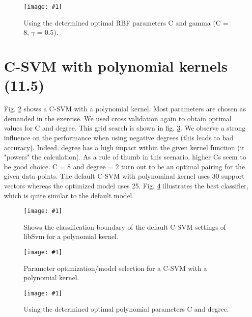 \documentclass[a4paper,headings=small]{scrartcl}
\newcommand{\image}[3]{
	\begin{figure}[htbp]
		\centering
		\texttt{[image: \#1]}
		\caption{#3}
		\label{fig:#1}
	\end{figure}
}
\begin{document}
\image{out_classifierSvm_cSvmRbfOptimalParams}{0.9}%
	{Using the determined optimal RBF parameters C and gamma (C = 8, $\gamma$ = 0.5).}


\section{C-SVM with polynomial kernels (11.5)}

Fig. \ref{fig:out_classifierSvm_cSvmPolyDefault} shows a C-SVM with a polynomial kernel. Most parameters are chosen as demanded in the exercise. We used cross validation again to obtain optimal values for C and degree. This grid search is shown in fig. \ref{fig:out_cSvmPolyParameterOptimization}. We observe a strong influence on the performance when using negative degrees (this leads to bad accuracy). Indeed, degree has a high impact within the given kernel function (it "powers" the calculation). As a rule of thumb in this scenario, higher Cs seem to be good choice. C = 8 and degree = 2 turn out to be an optimal pairing for the given data points. The default C-SVM with polynominal kernel uses 30 support vectors whereas the optimized model uses 25. Fig. \ref{fig:out_classifierSvm_cSvmPolyOptimalParams} illustrates the best classifier, which is quite similar to the default model.

\image{out_classifierSvm_cSvmPolyDefault}{0.9}%
	{Shows the classification boundary of the default C-SVM settings of libSvm for a polynomial kernel.}

\image{out_cSvmPolyParameterOptimization}{0.9}%
	{Parameter optimization/model selection for a C-SVM with a polynomial kernel.}

\image{out_classifierSvm_cSvmPolyOptimalParams}{0.9}%
	{Using the determined optimal polynomial parameters C and degree.}
\end{document}
